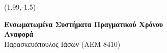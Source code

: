 \documentclass[10p]{report}
\begin{document}
\begin{textblock}{7.5}(1.99,-1.5)	
\begin{center}
\textbf{\Large{Ενσωματωμένα Συστήματα Πραγματικού Χρόνου}}\\
\textbf{\large{Αναφορά }} \\
\normalsize{Παρασκευόπουλος Ιάσων (ΑΕΜ 8410)}
\end{center}
\end{textblock}
\end{document}
